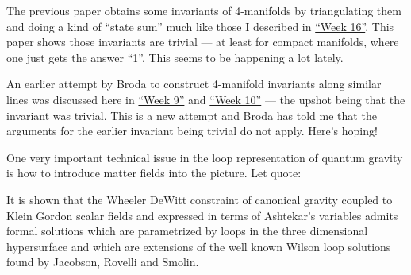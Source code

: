 \documentclass{article}
\def\tightlist{}
\renewcommand{\texttt}[1]{%
  \begingroup
  \ttfamily
  \begingroup\lccode`~=`/\lowercase{\endgroup\def~}{/\discretionary{}{}{}}%
  \begingroup\lccode`~=`[\lowercase{\endgroup\def~}{[\discretionary{}{}{}}%
  \begingroup\lccode`~=`.\lowercase{\endgroup\def~}{.\discretionary{}{}{}}%
  \catcode`/=\active\catcode`[=\active\catcode`.=\active
  \scantokens{#1\noexpand}%
  \endgroup
}
\begin{document}

The previous paper obtains some invariants of 4-manifolds by
triangulating them and doing a kind of ``state sum'' much like those I
described in \protect\hyperlink{week16}{``Week 16''}. This paper shows
those invariants are trivial --- at least for compact manifolds, where
one just gets the answer ``1''. This seems to be happening a lot lately.


An earlier attempt by Broda to construct 4-manifold invariants along
similar lines was discussed here in \protect\hyperlink{week9}{``Week
9''} and \protect\hyperlink{week10}{``Week 10''} --- the upshot being
that the invariant was trivial. This is a new attempt and Broda has told
me that the arguments for the earlier invariant being trivial do not
apply. Here's hoping!


One very important technical issue in the loop representation of quantum
gravity is how to introduce matter fields into the picture. Let quote:

It is shown that the Wheeler DeWitt constraint of canonical gravity
coupled to Klein Gordon scalar fields and expressed in terms of
Ashtekar's variables admits formal solutions which are parametrized by
loops in the three dimensional hypersurface and which are extensions of
the well known Wilson loop solutions found by Jacobson, Rovelli and
Smolin.
\end{document}
